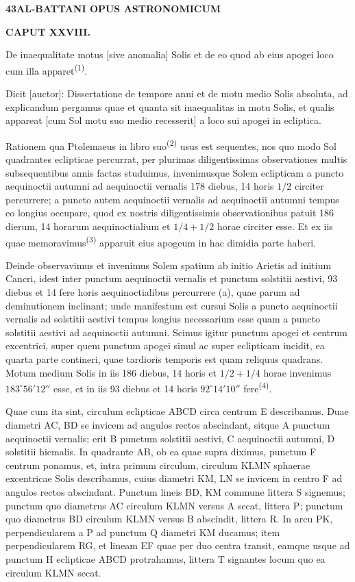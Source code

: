 \documentclass[10pt,a4paper]{article}
\newcommand{\SP}[3]{%
  \clearpage
  \hypertarget{AB01-PDF#1}{}%
  \begin{center}
    \textbf{#2\quad #3}
  \end{center}%
}
\newcommand{\A}[1]{\hypertarget{#1}{}}
\newcommand{\NM}[1]{\textsuperscript{(#1)}}
\begin{document}
\SP{0132}{43}{AL-BATTANI OPUS ASTRONOMICUM}

\A{AB01-PDF0132-H01}
\begin{center}
\textbf{CAPUT XXVIII.}\par
De inaequalitate motus [sive anomalia] Solis et de eo quod
ab eius apogei loco cum illa apparet\NM{1}.
\end{center}

\A{AB01-PDF0132-P01}
Dicit [auctor]: Dissertatione de tempore anni et de motu medio
Solis absoluta, ad explicandum pergamus quae et quanta sit
inaequalitas in motu Solis, et qualis appareat [cum Sol motu suo
medio recesserit] a loco sui apogei in ecliptica.

\A{AB01-PDF0132-P02}
Rationem qua Ptolemaeus in libro suo\NM{2} usus est sequentes,
nos quo modo Sol quadrantes eclipticae percurrat, per plurimas
diligentissimas observationes multis subsequentibus annis factas
studuimus, invenimusque Solem eclipticam a puncto aequinoctii
autumni ad aequinoctii vernalis 178 diebus, 14 horis $1/2$
circiter percurrere; a puncto autem aequinoctii vernalis ad
aequinoctii autumni tempus eo longius occupare, quod ex nostris
diligentissimis observationibus patuit 186 dierum, 14 horarum
aequinoctialium et $1/4+1/2$ horae circiter esse. Et ex iis quae
memoravimus\NM{3} apparuit eius apogeum in hac dimidia parte haberi.

\A{AB01-PDF0132-P03}
Deinde observavimus et invenimus Solem spatium ab initio Arietis
ad initium Cancri, idest inter punctum aequinoctii vernalis et
punctum solstitii aestivi, 93 diebus et 14 fere horis
aequinoctialibus percurrere (a), quae parum ad deminutionem
inclinant; unde manifestum est cursui Solis a puncto aequinoctii
vernalis ad solstitii aestivi tempus longius necessarium esse
quam a puncto solstitii aestivi ad aequinoctii autumni.
Scimus igitur punctum apogei et centrum excentrici, super quem
punctum apogei simul ac super eclipticam incidit, ea quarta parte
contineri, quae tardioris temporis est quam reliquus quadrans.
Motum medium Solis in iis 186 diebus, 14 horis et $1/2+1/4$
horae invenimus $183^\circ56'12''$ esse, et in iis 93 diebus et
14 horis $92^\circ14'10''$ fere\NM{4}.

\A{AB01-PDF0132-P04}
Quae cum ita sint, circulum eclipticae ABCD circa centrum E
describamus. Duae diametri AC, BD se invicem ad angulos rectos
abscindant, sitque A punctum aequinoctii vernalis; erit B punctum
solstitii aestivi, C aequinoctii autumni, D solstitii hiemalis.
In quadrante AB, ob ea quae supra diximus, punctum F centrum
ponamus, et, intra primum circulum, circulum KLMN sphaerae
excentricae Solis describamus, cuius diametri KM, LN se invicem
in centro F ad angulos rectos abscindant. Punctum lineis BD, KM
commune littera S signemus; punctum quo diametrus AC circulum
KLMN versus A secat, littera P; punctum quo diametrus BD circulum
KLMN versus B abscindit, littera R. In arcu PK, perpendicularem
a P ad punctum Q diametri KM ducamus; item perpendicularem RG,
et lineam EF quae per duo centra transit, eamque usque ad
punctum H eclipticae ABCD protrahamus, littera T signantes locum
quo ea circulum KLMN secat.
\end{document}
